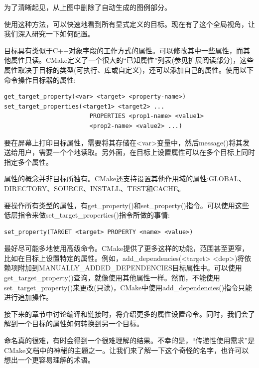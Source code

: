 为了清晰起见，从上图中删除了自动生成的图例部分。

使用这种方法，可以快速地看到所有显式定义的目标。现在有了这个全局视角，让我们深入研究一下如何配置。
 

目标具有类似于C++对象字段的工作方式的属性。可以修改其中一些属性，而其他属性只读。CMake定义了一个很大的“已知属性”列表(参见扩展阅读部分)，这些属性取决于目标的类型(可执行、库或自定义)，还可以添加自己的属性。使用以下命令操作目标器的属性:

\begin{lstlisting}[style=styleCMake]
get_target_property(<var> <target> <property-name>)
set_target_properties(<target1> <target2> ...
						PROPERTIES <prop1-name> <value1>
						<prop2-name> <value2> ...)
\end{lstlisting}

要在屏幕上打印目标属性，需要将其存储在<var>变量中，然后message()将其发送给用户，需要一个个地读取。另外面，在目标上设置属性可以在多个目标上同时指定多个属性。

属性的概念并非目标所独有。CMake还支持设置其他作用域的属性:GLOBAL、DIRECTORY、SOURCE、INSTALL、TEST和CACHE。

要操作所有类型的属性，有get\_property()和set\_property()指令。可以使用这些低层指令来做set\_target\_properties()指令所做的事情:

\begin{lstlisting}[style=styleCMake]
set_property(TARGET <target> PROPERTY <name> <value>)
\end{lstlisting}

最好尽可能多地使用高级命令。CMake提供了更多这样的功能，范围甚至更窄，比如在目标上设置特定的属性。例如，add\_dependencies(<target> <dep>)将依赖项附加到MANUALLY\_ADDED\_DEPENDENCIES目标属性中。可以使用get\_target\_property()查询，就像使用其他属性一样。然而，不能使用set\_target\_property()来更改(只读)，CMake中使用add\_dependencies()指令只能进行追加操作。

接下来的章节中讨论编译和链接时，将介绍更多的属性设置命令。同时，我们会了解到一个目标的属性如何转换到另一个目标。


命名真的很难，有时会得到一个很难理解的结果。不幸的是，“传递性使用需求”是CMake文档中的神秘的主题之一。让我们来了解一下这个奇怪的名字，也许可以想出一个更容易理解的术语。

